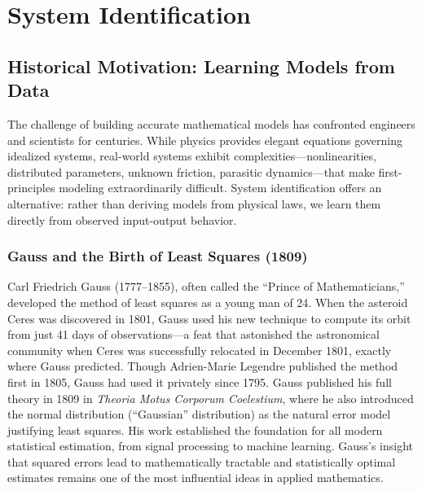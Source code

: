 
\chapter{System Identification}
\label{ch:system_identification}


\section{Historical Motivation: Learning Models from Data}
\label{sec:sysid_history}

The challenge of building accurate mathematical models has confronted engineers and scientists for centuries. While physics provides elegant equations governing idealized systems, real-world systems exhibit complexities---nonlinearities, distributed parameters, unknown friction, parasitic dynamics---that make first-principles modeling extraordinarily difficult. System identification offers an alternative: rather than deriving models from physical laws, we learn them directly from observed input-output behavior.

\subsection{Gauss and the Birth of Least Squares (1809)}
\label{subsec:gauss}

\begin{historicalbox}
Carl Friedrich Gauss (1777--1855), often called the ``Prince of Mathematicians,'' developed the method of least squares as a young man of 24. When the asteroid Ceres was discovered in 1801, Gauss used his new technique to compute its orbit from just 41 days of observations---a feat that astonished the astronomical community when Ceres was successfully relocated in December 1801, exactly where Gauss predicted. Though Adrien-Marie Legendre published the method first in 1805, Gauss had used it privately since 1795. Gauss published his full theory in 1809 in \textit{Theoria Motus Corporum Coelestium}, where he also introduced the normal distribution (``Gaussian'' distribution) as the natural error model justifying least squares. His work established the foundation for all modern statistical estimation, from signal processing to machine learning. Gauss's insight that squared errors lead to mathematically tractable and statistically optimal estimates remains one of the most influential ideas in applied mathematics.
\end{historicalbox}

